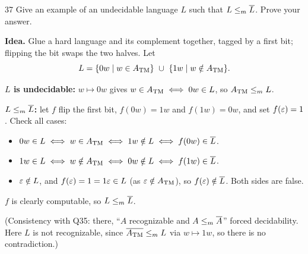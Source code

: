 \begin{question}{37}
Give an example of an undecidable language $L$ such that $L\le_{m}\overline{L}$. Prove your answer.
\end{question}
\begin{soln}
\textbf{Idea.} Glue a hard language and its complement together, tagged by a first bit; flipping the bit swaps the two halves. Let
\[
L=\{0w\mid w\in A_{\mathrm{TM}}\}\ \cup\ \{1w\mid w\notin A_{\mathrm{TM}}\}.
\]

\textbf{$L$ is undecidable:} $w\mapsto 0w$ gives $w\in A_{\mathrm{TM}}\iff 0w\in L$, so $A_{\mathrm{TM}}\le_{m} L$.

\textbf{$L\le_{m}\overline{L}$:} let $f$ flip the first bit, $f(0w)=1w$ and $f(1w)=0w$, and set $f(\varepsilon)=1$. Check all cases:
\begin{itemize}
\item $0w\in L\iff w\in A_{\mathrm{TM}}\iff 1w\notin L\iff f(0w)\in\overline{L}$.
\item $1w\in L\iff w\notin A_{\mathrm{TM}}\iff 0w\notin L\iff f(1w)\in\overline{L}$.
\item $\varepsilon\notin L$, and $f(\varepsilon)=1=1\varepsilon\in L$ (as $\varepsilon\notin A_{\mathrm{TM}}$), so $f(\varepsilon)\notin\overline{L}$. Both sides are false. \checkmark
\end{itemize}
$f$ is clearly computable, so $L\le_{m}\overline{L}$.

(Consistency with Q35: there, ``$A$ recognizable and $A\le_{m}\overline{A}$'' forced decidability. Here $L$ is not recognizable, since $\overline{A_{\mathrm{TM}}}\le_{m} L$ via $w\mapsto 1w$, so there is no contradiction.)
\end{soln}

